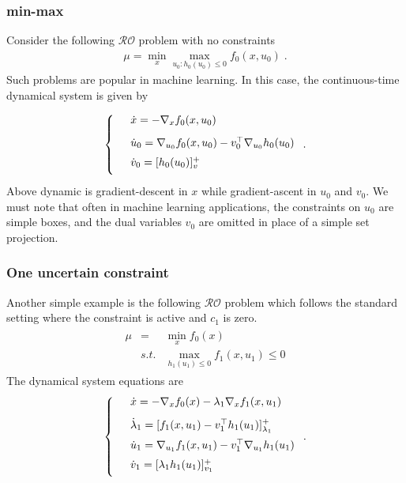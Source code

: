 \documentclass[journal,twoside,web]{ieeecolor}
\begin{document}
\subsubsection{min-max} Consider the following $\mathcal{RO}$ problem with no constraints
\begin{align*}
\mu=\min_x\max_{u_0:h_0(u_0)\leq 0}f_0(x,u_0)\;.
\end{align*}
Such problems are popular in machine learning. In this case, the continuous-time dynamical system is given by

\begin{align*}
\left\{
\begin{array}{cl}
\vspace{3mm}
&\dot{x}=-\nabla_x f_0(x,u_0)\\
\vspace{2mm}
&\dot{u}_0=\nabla_{u_0}f_0(x,u_0)-v_0^\top \nabla_{u_0} h_0(u_0)\\
\vspace{2mm}
&\dot{v}_0=[h_0(u_0)]_v^+
\end{array}\right..
\end{align*}
Above dynamic is gradient-descent in $x$ while gradient-ascent in $u_0$ and $v_0$. We must note that often in machine learning applications, the constraints on $u_0$ are simple boxes, and the dual variables $v_0$ are omitted in place of a simple set projection.

\subsubsection{One uncertain constraint}
Another simple example is the following $\mathcal{RO}$ problem which follows the standard setting where the constraint is active and $c_1$ is zero.
\begin{align*}
\begin{array}{lcl}\mu&=&\displaystyle\min_x f_0(x)\\
&s.t.&\displaystyle \max_{h_1(u_1)\leq 0}f_1(x,u_1)\leq 0
\end{array}
\end{align*}
The dynamical system equations are
\begin{align*}
\left\{
\begin{array}{cl}
\vspace{3mm}
&\dot{x}=-\nabla_x f_0(x)-\lambda_1 \nabla_x f_1(x,u_1)\\
\vspace{2mm}
&\dot{\lambda}_1=[f_1(x,u_1)-v_1^\top h_1(u_1)]_{\lambda_1}^+\\
\vspace{2mm}
&\dot{u}_1=\nabla_{u_1} f_1(x,u_1)-v_1^\top \nabla_{u_1}h_1(u_1)\\
\vspace{2mm}
&\dot{v}_1=[\lambda_1h_1(u_1)]_{v_1}^+
\end{array}\right..
\end{align*}
\end{document}
